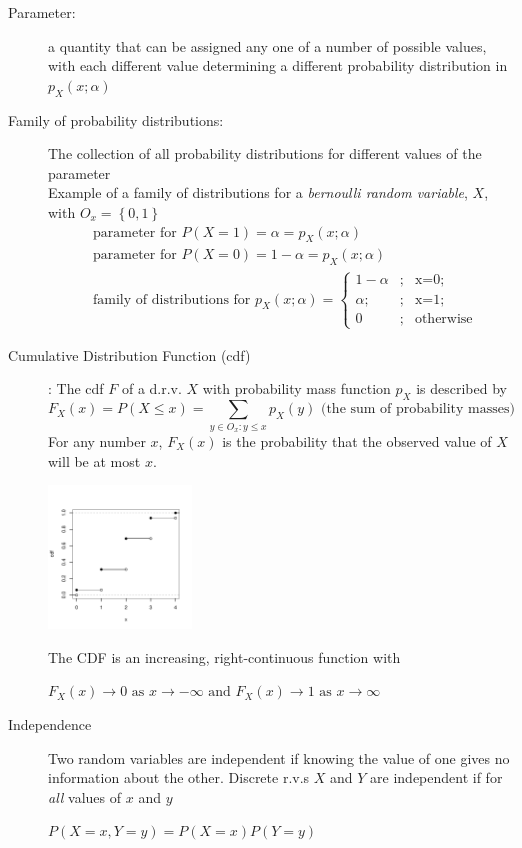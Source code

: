 \documentclass[10pt,landscape]{article}
\begin{document}
\begin{multicols}{3}
\begin{description}
	\item[Parameter:]  a quantity that can be assigned any one of a number of possible values, with each different value determining a different probability distribution in $p_X(x;\alpha)$
	\item[Family of probability distributions:] The collection of all probability distributions for different values of the parameter\\
	\vspace{2pt}
Example of a family of distributions for a \emph{bernoulli random variable}, $X$, with $O_x = \left \{ {0, 1} \right \}$
\begin{align*}
& \text{parameter for } P(X=1) = \alpha = p_X(x;\alpha)\\
& \text{parameter for } P(X=0) = 1-\alpha = p_X(x;\alpha)\\
& \text{family of distributions for } p_X(x;\alpha) = \left\{\begin{array}{lcl} 1-\alpha &; & \mbox{x=0}; \\ \alpha; &; & \mbox{x=1}; \\ 0 & ; & \mbox{otherwise} \end{array} \right.
\end{align*}
	\item[Cumulative Distribution Function (cdf)]: The cdf $F$ of a d.r.v. $X$ with probability mass function $p_X$ is described by
\[F_X(x)=P(X \leq x)=\sum_{y \in O_x : y \leq x}{p_X(y)} \text{ (the sum of probability masses)}\]
For any number $x$, $F_X(x)$ is the probability that the observed value of $X$ will be at most $x$.
\begin{minipage}{\linewidth}
            \centering
\includegraphics[width=1.5in]{figures/Bincdf.pdf}
        \end{minipage}
The CDF is an increasing, right-continuous function with  \begin{center}
$F_X(x) \to 0 \textrm{ as $x \to -\infty$ and } F_X(x) \to 1 \textrm{ as $x \to \infty$}$
\end{center}

\item[Independence] Two random variables are independent if knowing the value of one gives no information about the other. Discrete r.v.s $X$ and $Y$ are independent if for \emph{all} values of $x$ and $y$  \begin{center}
$P(X=x, Y=y) = P(X = x)P(Y = y)$
\end{center}
\end{description}


\end{multicols}
\end{document}
